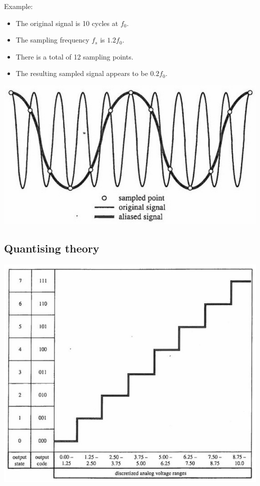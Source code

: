 \documentclass[11pt]{article}
\begin{document}
Example:
\begin{itemize}
\item The original signal is 10 cycles at \(f_0\).
\item The sampling frequency \(f_s\) is \(1.2 f_0\).
\item There is a total of 12 sampling points.
\item The resulting sampled signal appears to be \(0.2 f_0\).
\end{itemize}

\begin{center}
\includegraphics[width=.9\linewidth]{./images/aliasing-example.png}
\end{center}
\subsection{Quantising theory}
\label{sec:org55979b4}
\begin{center}
\includegraphics[width=.9\linewidth]{./images/quantising-theory.png}
\end{center}
\end{document}
